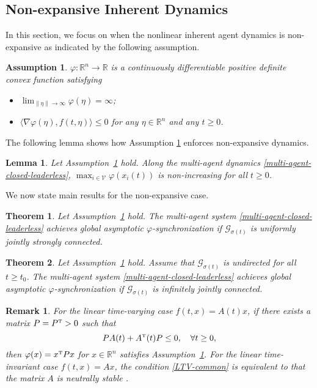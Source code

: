 \documentclass[a4paper, 11pt]{article}
\newcommand{\T}{^{\mbox{\tiny T}}}
\newtheorem{theorem}{Theorem}
\newtheorem{assumption}{Assumption}
\newtheorem{lemma}{Lemma}
\newtheorem{remark}{Remark}
\def\R{\mathbb{R}}
\begin{document}
\subsection{Non-expansive Inherent Dynamics}\label{sec-ll}
In this section, we focus on when the nonlinear inherent agent dynamics is non-expansive as indicated by the following assumption.

\begin{assumption}\label{ass-lyap}
$\varphi: {\R}^n \rightarrow \R$ is a continuously differentiable positive definite convex function
satisfying
\begin{itemize}
\item[(i).] $\lim_{\|\eta\| \rightarrow \infty}\varphi(\eta)=\infty$;
\item[(ii).] $\langle \nabla \varphi(\eta), f(t,\eta) \rangle \leq 0$ for any $\eta \in {\R}^n$ and any $t \geq 0$.
\end{itemize}
\end{assumption}

The following lemma shows how Assumption  \ref{ass-lyap} enforces non-expansive dynamics.
\begin{lemma}\label{lem-invariant-leaderless}
Let Assumption~\ref{ass-lyap} hold. Along the multi-agent dynamics \eqref{multi-agent-closed-leaderless},
$\max_{i \in \mathcal{V}} \varphi(x_i(t))$ is non-increasing for all $t \geq 0$.
\end{lemma}

We now state main results for the non-expansive case.
\begin{theorem}\label{thm1-leaderless}
Let Assumption~\ref{ass-lyap} hold.
The multi-agent system \eqref{multi-agent-closed-leaderless} achieves
global asymptotic $\varphi$-synchronization if $\mathcal{G}_{\sigma(t)}$ is uniformly jointly strongly connected.
\end{theorem}


\begin{theorem}\label{thm2-leaderless}
Let Assumption~\ref{ass-lyap} hold.
Assume that $\mathcal{G}_{\sigma(t)}$ is undirected for all $t \geq t_0$.
The multi-agent system \eqref{multi-agent-closed-leaderless} achieves global asymptotic $\varphi$-synchronization if $\mathcal{G}_{\sigma(t)}$ is infinitely jointly connected.
\end{theorem}

\begin{remark}\label{remark-ass-stable}
For the linear time-varying case $f(t,x)=A(t) x$, if there exists a matrix $P=P\T>0$ such that
\begin{equation}\label{LTV-common}
P A(t)+A\T(t)P \leq 0, \quad \forall t \geq 0,
\end{equation}
then $\varphi(x)=x\T P x$ for $x\in {\R}^n$ satisfies Assumption~\ref{ass-lyap}.
For the linear time-invariant case $f(t,x)=A x$, the condition \eqref{LTV-common} is
equivalent to that the matrix $A$ is neutrally stable \cite{su-huang-tac}.
\end{remark}
\end{document}
